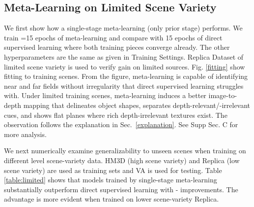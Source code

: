 \subsection{Meta-Learning on Limited Scene Variety} 
\label{experiments:scene-fitting}
We first show how a single-stage meta-learning (only prior stage) performs. We train =15 epochs of meta-learning and compare with 15 epochs of direct supervised learning where both training pieces converge already. 
The other hyperparameters are the same as given in Training Settings. 
Replica Dataset of limited scene variety is used to verify gain on limited sources.
Fig. \ref{fitting} show fitting to training scenes. 
From the figure, meta-learning is capable of identifying near and far fields without irregularity that direct supervised learning struggles with. Under limited training scenes, meta-learning induces a better image-to-depth mapping that delineates object shapes, separates depth-relevant/-irrelevant cues, and shows flat planes where rich depth-irrelevant textures exist. The observation follows the explanation in Sec.~\ref{explanation}. See Supp Sec. C for more analysis.


We next numerically examine generalizability to unseen scenes when training on different level scene-variety data. HM3D (high scene variety) and Replica (low scene variety) are used as training sets and VA is used for testing. Table \ref{table:limited} shows that models trained by single-stage meta-learning substantially outperform direct supervised learning with - improvements. The advantage is more evident when trained on lower scene-variety Replica. 



